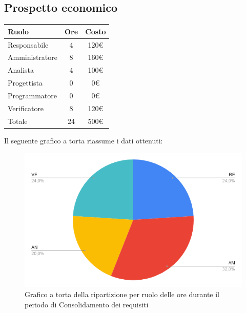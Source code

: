 {{{\subsection{Prospetto economico}\label{PreventivoFaseDiConsolidamentoDeiRequisitiProspettoEconomico}
\quad
\def\tabularxcolumn#1{m{#1}}
{
	\begin{center}
		\renewcommand{\arraystretch}{1.4}
		\begin{tabularx}{7cm}{|X|c|c|}
			\hline
			\rowcolor{airforceblue}
			\textbf{Ruolo} & \textbf{Ore} & \textbf{Costo}\\
			\hline
			Responsabile & 4 & 120\euro\\
			\hline
			Amministratore & 8 & 160\euro\\
			\hline
			Analista & 4 & 100\euro\\
			\hline
			Progettista & 0 & 0\euro\\
			\hline
			Programmatore & 0 & 0\euro\\
			\hline
			Verificatore & 8 & 120\euro\\
			\hline
			Totale & 24 & 500\euro\\
			\hline
		\end{tabularx}
	\end{center}
Il seguente grafico a torta riassume i dati ottenuti:
\begin{figure}[!ht]
	\begin{center}
		\includegraphics[width=0.8\linewidth]{../immagini/pdp/torta_consolidamento_requisiti.png}
		\caption{Grafico a torta della ripartizione per ruolo delle ore durante il periodo di Consolidamento dei requisiti}
	\end{center}
\end{figure}

}}}}
